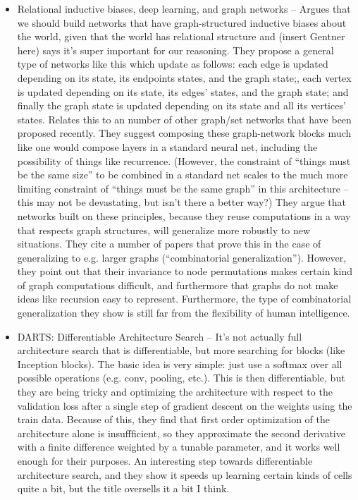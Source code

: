 \documentclass[11pt]{article}
\begin{document}
\begin{itemize}
\item Relational inductive biases, deep learning, and graph networks -- Argues that we should build networks that have graph-structured inductive biases about the world, given that the world has relational structure and (insert Gentner here) says it's super important for our reasoning. They propose a general type of networks like this which update as follows: each edge is updated depending on its state, its endpoints states, and the graph state;, each vertex is updated depending on its state, its edges' states, and the graph state; and finally the graph state is updated depending on its state and all its vertices' states. Relates this to an number of other graph/set networks that have been proposed recently. They suggest composing these graph-network blocks much like one would compose layers in a standard neural net, including the possibility of things like recurrence. (However, the constraint of ``things must be the same size'' to be combined in a standard net scales to the much more limiting constraint of ``things must be the same graph'' in this architecture -- this may not be devastating, but isn't there a better way?) They argue that networks built on these principles, because they reuse computations in a way that respects graph structures, will generalize more robustly to new situations. They cite a number of papers that prove this in the case of generalizing to e.g. larger graphs (``combinatorial generalization''). However, they point out that their invariance to node permutations makes certain kind of graph computations difficult, and furthermore that graphs do not make ideas like recursion easy to represent. Furthermore, the type of combinatorial generalization they show is still far from the flexibility of human intelligence.\citep{Battaglia2018} 
\item DARTS: Differentiable Architecture Search -- It's not actually full architecture search that is differentiable, but more searching for blocks (like Inception blocks). The basic idea is very simple: just use a softmax over all possible operations (e.g. conv, pooling, etc.). This is then differentiable, but they are being tricky and optimizing the architecture with respect to the validation loss after a single step of gradient descent on the weights using the train data. Because of this, they find that first order optimization of the architecture alone is insuffficient, so they approximate the second derivative with a finite difference weighted by a tunable parameter, and it works well enough for their purposes. An interesting step towards differentiable architecture search, and they show it speeds up learning certain kinds of cells quite a bit, but the title oversells it a bit I think.  

\end{itemize}
\end{document}
